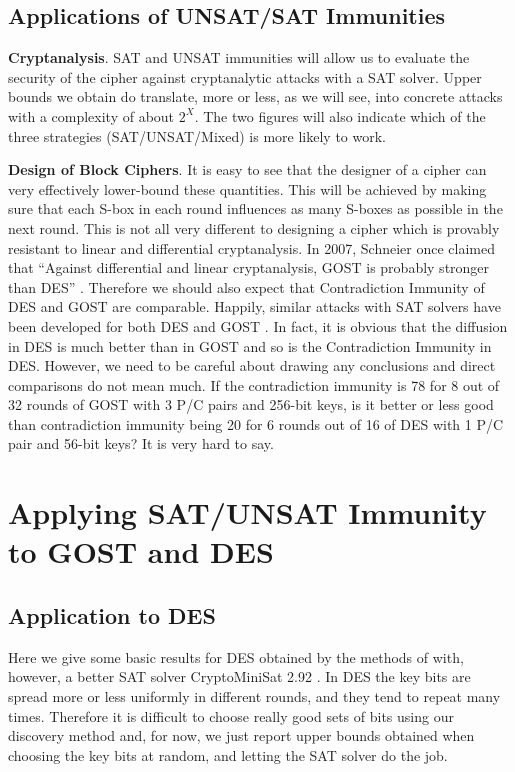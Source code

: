 \subsection{Applications of UNSAT/SAT Immunities}
\noindent 
{\bf Cryptanalysis}. %
SAT and UNSAT immunities will allow us to evaluate the security of the cipher against cryptanalytic attacks with a SAT solver. Upper bounds we obtain do translate, more or less, as we will see,
into concrete attacks with a complexity of about $2^{X}$. The two figures will also indicate which of the three
strategies (SAT/UNSAT/Mixed) is more likely to work.

\noindent
{\bf Design of Block Ciphers}.
It is easy to see that the designer of a cipher can very effectively lower-bound these quantities.
This will be achieved by making sure
that each S-box in each round
influences as many S-boxes as possible in the next round.
This is not all very different to designing a cipher
which is provably resistant to linear and differential cryptanalysis.
In 2007, Schneier once claimed that ``Against differential and linear cryptanalysis, GOST is probably stronger than DES''
\cite{schneier2007applied}.
Therefore we should also expect that Contradiction Immunity
of DES and GOST are comparable.
Happily, similar attacks with SAT solvers have been developed
for both DES \cite{DEScourtois} and GOST \cite{OptimiPaper}.
In fact, it is obvious that the diffusion in DES
is much better than in GOST and so is the Contradiction Immunity in DES.
However, we need to be careful about drawing any conclusions
and direct comparisons do not mean much.
If the contradiction immunity is 78 for 8 out of 32 rounds of GOST with 3 P/C pairs and 256-bit keys,
is it better or less good
than contradiction immunity
being 20 for 6 rounds out of 16 of DES with 1 P/C pair and 56-bit keys?
It is very hard to say.

\section{Applying SAT/UNSAT Immunity to GOST and DES}

\subsection{Application to DES}
Here we give some basic results for DES obtained by the methods of \cite{DEScourtois}
with, however, a better SAT solver CryptoMiniSat 2.92 \cite{CryptoMiniSat}. In DES the key bits are spread more or less uniformly in different rounds, and they tend to repeat many times. Therefore it is difficult to choose really good sets of bits using our discovery method and, for now, we just report upper bounds obtained when choosing
the key bits at random, and letting the SAT solver do the job. 

